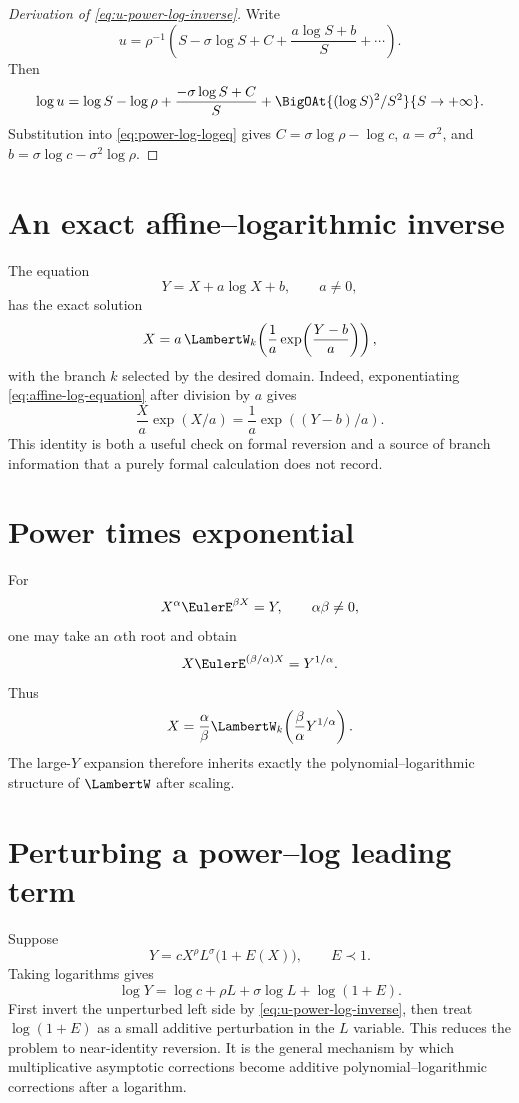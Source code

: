 \documentclass[11pt,oneside]{book}
\theoremstyle{definition}
\theoremstyle{remark}
\newcommand{\precdom}{\prec}
\begin{document}
\begin{proof}[Derivation of \eqref{eq:u-power-log-inverse}]
Write
\[
 u=\rho^{-1}\left(S-\sigma\log S+C+\frac{a\log S+b}{S}+\cdots\right).
\]
Then
\[
 \log u=\log S-\log\rho
 +\frac{-\sigma\log S+C}{S}
 +\BigOAt{(\log S)^2/S^2}{S\to+\infty}.
\]
Substitution into \eqref{eq:power-log-logeq} gives
$C=\sigma\log\rho-\log c$, $a=\sigma^2$, and
$b=\sigma\log c-\sigma^2\log\rho$.
\end{proof}

\section{An exact affine--logarithmic inverse}
The equation
\begin{equation}\label{eq:affine-log-equation}
 Y=X+a\log X+b,
 \qquad a\ne0,
\end{equation}
has the exact solution
\begin{equation}\label{eq:affine-log-W}
 X=a\,\LambertW_k\!\left(\frac1a
 \exp\!\left(\frac{Y-b}{a}\right)\right),
\end{equation}
with the branch $k$ selected by the desired domain.  Indeed, exponentiating
\eqref{eq:affine-log-equation} after division by $a$ gives
\[
 \frac Xa\exp(X/a)=\frac1a\exp((Y-b)/a).
\]
This identity is both a useful check on formal reversion and a source of
branch information that a purely formal calculation does not record.

\section{Power times exponential}
For
\begin{equation}\label{eq:power-exp-equation}
 X^\alpha\EulerE^{\beta X}=Y,
 \qquad \alpha\beta\ne0,
\end{equation}
one may take an $\alpha$th root and obtain
\[
 X\EulerE^{(\beta/\alpha)X}=Y^{1/\alpha}.
\]
Thus
\begin{equation}\label{eq:power-exp-W}
 X=\frac{\alpha}{\beta}
 \LambertW_k\!\left(\frac{\beta}{\alpha}Y^{1/\alpha}\right).
\end{equation}
The large-$Y$ expansion therefore inherits exactly the
polynomial--logarithmic structure of $\LambertW$ after scaling.

\section{Perturbing a power--log leading term}
Suppose
\begin{equation}\label{eq:perturbed-power-log}
 Y=cX^\rho L^\sigma\bigl(1+E(X)\bigr),
 \qquad E\precdom1.
\end{equation}
Taking logarithms gives
\[
 \log Y=\log c+\rho L+\sigma\log L+\log(1+E).
\]
First invert the unperturbed left side by \eqref{eq:u-power-log-inverse}, then
treat $\log(1+E)$ as a small additive perturbation in the $L$ variable.
This reduces the problem to near-identity reversion.  It is the general
mechanism by which multiplicative asymptotic corrections become additive
polynomial--logarithmic corrections after a logarithm.
\end{document}
